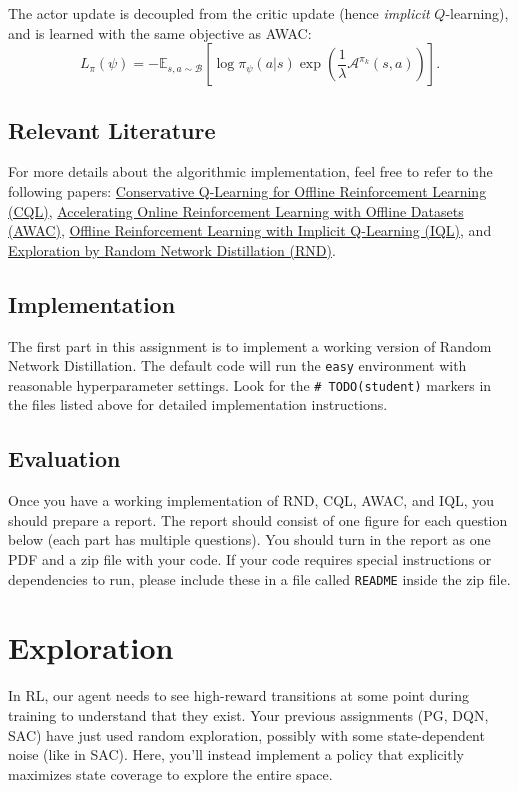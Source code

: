\documentclass{article}
\begin{document}
The actor update is decoupled from the critic update (hence \textit{implicit} $Q$-learning), and is learned with the same objective as AWAC:
\begin{equation}
    L_\pi(\psi) = -\mathbb{E}_{s, a \sim \mathcal{B}} \left[\log \pi_{\psi}(a|s) \exp(\frac{1}{\lambda} \mathcal{A}^{\pi_{k}}(s,a)) \right].
\end{equation}

\subsection{Relevant Literature}
For more details about the algorithmic implementation, feel free to refer to the following papers: \href{https://arxiv.org/abs/2006.04779}{Conservative Q-Learning for Offline Reinforcement Learning (CQL)}, \href{https://arxiv.org/abs/2006.09359}{Accelerating Online Reinforcement Learning with Offline Datasets (AWAC)}, \href{https://arxiv.org/abs/1810.12894}{Offline Reinforcement Learning with Implicit Q-Learning (IQL)}, and \href{https://arxiv.org/abs/2110.06169}{Exploration by Random Network Distillation (RND)}.

\subsection{Implementation}
The first part in this assignment is to implement a working version of Random Network Distillation. The default code will run the \texttt{easy} environment with reasonable hyperparameter settings. Look for the \texttt{\# TODO(student)} markers in the files listed above for detailed implementation instructions.
\subsection{Evaluation}

Once you have a working implementation of RND, CQL, AWAC, and IQL, you should prepare a report. The report should consist of one figure for each question below (each part has multiple questions). You should turn in the report as one PDF and a zip file with your code. If your code requires special instructions or dependencies to run, please include these in a file called \verb+README+ inside the zip file.

\section{Exploration}
In RL, our agent needs to see high-reward transitions at some point during training to understand that they exist. Your previous assignments (PG, DQN, SAC) have just used random exploration, possibly with some state-dependent noise (like in SAC). Here, you'll instead implement a policy that explicitly maximizes state coverage to explore the entire space.
\end{document}
